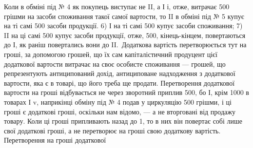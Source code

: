 Коли в обміні під № 4 як покупець виступає не II, а І і, отже, витрачає
500 грішми на засоби споживання такої самої вартости, то II
в обміні під № 5 купує на ті самі 500 засоби продукції.
6) І на ті самі 500 купує засоби споживання; 7) II на ці самі
500 купує засоби продукції, отже, 500, кінець-кінцем,
повертаються до І, як раніш повертались вони до II.~Додаткова вартість
перетворюється тут на гроші, за допомогою грошей, що їх сам капіталістичний
продуцент цієї додаткової вартости витрачає на своє особисте
споживання — грошей, що репрезентують антиципований дохід, антициповане
надходження з додаткової вартости, яка є в товарі, що його треба
ще продати. Перетворення додаткової вартости на гроші відбувається не
через зворотний приплив 500, бо І, крім 1000
в товарах І v, наприкінці обміну під № 4 подав у циркуляцію 500 грішми, і ці гроші є додаткові гроші, оскільки нам відомо, — а не
вторговані від продажу товару. Коли ці гроші припливають назад до 1,
то в них він повертає собі лише свої додаткові гроші, а не перетворює
на гроші свою додаткову вартість. Перетворення на гроші додаткової
\parbreak{}  %

